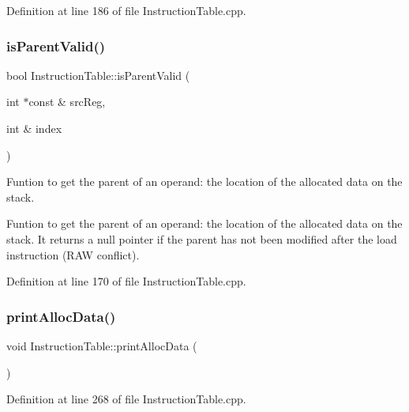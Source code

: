 Definition at line 186 of file Instruction\+Table.\+cpp.

\mbox{\label{classoctantis_1_1InstructionTable_afb6d1bf3c1ae3301c2b61ceca1e06153}} 
\subsubsection{\texorpdfstring{is\+Parent\+Valid()}{isParentValid()}}
{\footnotesize\ttfamily bool Instruction\+Table\+::is\+Parent\+Valid (\begin{DoxyParamCaption}\item[{int $\ast$const \&}]{src\+Reg,  }\item[{int \&}]{index }\end{DoxyParamCaption})}

Funtion to get the parent of an operand\+: the location of the allocated data on the stack.

Funtion to get the parent of an operand\+: the location of the allocated data on the stack. It returns a null pointer if the parent has not been modified after the load instruction (R\+AW conflict). 

Definition at line 170 of file Instruction\+Table.\+cpp.

\mbox{\label{classoctantis_1_1InstructionTable_a0ed0b3774f3551c6a1161394a33ea8d3}} 
\subsubsection{\texorpdfstring{print\+Alloc\+Data()}{printAllocData()}}
{\footnotesize\ttfamily void Instruction\+Table\+::print\+Alloc\+Data (\begin{DoxyParamCaption}{ }\end{DoxyParamCaption})}



Definition at line 268 of file Instruction\+Table.\+cpp.

\mbox{\label{classoctantis_1_1InstructionTable_a949d0ad63e3f990f845fdb632b4c97fa}} 
